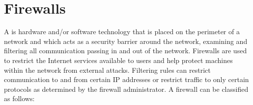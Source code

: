
\section{Firewalls}\label{Se:Firewalls}


A  is hardware and/or software technology that is placed on the
perimeter of a network and which acts as a security barrier around the network,
examining and filtering all communication passing in and out of the network.
Firewalls are used to restrict the Internet services available to users and help protect
machines within the network from external attacks.
Filtering rules can restrict communication to and from certain IP addresses
or restrict traffic to only certain protocols as determined by the firewall administrator.
A firewall can be classified as follows:
